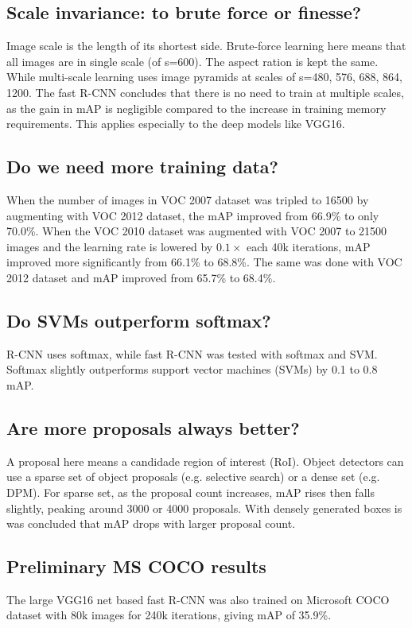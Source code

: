 \documentclass[10pt]{article}
\begin{document}
\subsection{Scale invariance: to brute force or finesse?}
Image scale is the length of its shortest side. Brute-force learning here means that all images are in single scale (of s=600). The aspect ration is kept the same. While multi-scale learning uses image pyramids at scales of s={480, 576, 688, 864, 1200}. The fast R-CNN concludes that there is no need to train at multiple scales, as the gain in mAP is negligible compared to the increase in training memory requirements. This applies especially to the deep models like VGG16.

\subsection{Do we need more training data?}
When the number of images in VOC 2007 dataset was tripled to 16500 by augmenting with VOC 2012 dataset, the mAP improved from 66.9\% to only 70.0\%. When the VOC 2010 dataset was augmented with VOC 2007 to 21500 images and the learning rate is lowered by $0.1\times$ each 40k iterations, mAP improved more significantly from 66.1\% to 68.8\%. The same was done with VOC 2012 dataset and mAP improved from 65.7\% to 68.4\%.

\subsection{Do SVMs outperform softmax?}
R-CNN uses softmax, while fast R-CNN was tested with softmax and SVM. Softmax slightly outperforms support vector machines (SVMs) by 0.1 to 0.8 mAP.

\subsection{Are more proposals always better?}
A proposal here means a candidade region of interest (RoI). Object detectors can use a sparse set of object proposals (e.g. selective search) or a dense set (e.g. DPM). For sparse set, as the proposal count increases, mAP rises then falls slightly, peaking around 3000 or 4000 proposals. With densely generated boxes is was concluded that mAP drops with larger proposal count.

\subsection{Preliminary MS COCO results}
The large VGG16 net based fast R-CNN was also trained on Microsoft COCO dataset with 80k images for 240k iterations, giving mAP of 35.9\%.
\end{document}
